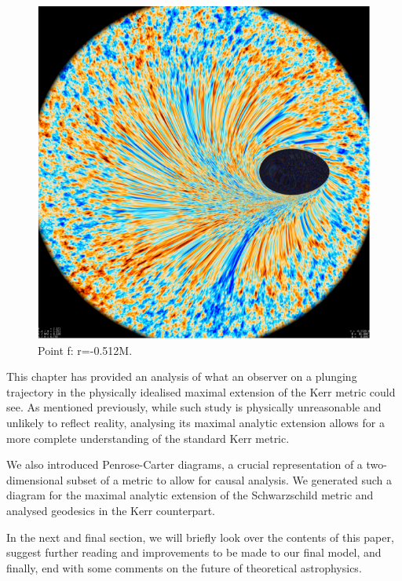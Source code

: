 \documentclass[oneside,openright,frontopenright, singlespacing]{dmathesis}
\begin{document}
\begin{figure}[!ht]
	\centering
	\includegraphics[width=0.63\linewidth]{img/plunging6}
	\caption{Point f: r=-0.512M.}
	\label{fig:Figure6.7}
\end{figure}

	This chapter has provided an analysis of what an observer on a plunging trajectory in the physically idealised maximal extension of the Kerr metric could see. As mentioned previously, while such study is physically unreasonable and unlikely to reflect reality, analysing its maximal analytic extension allows for a more complete understanding of the standard Kerr metric.

\vspace{1em}
	We also introduced Penrose-Carter diagrams, a crucial representation of a two-dimensional subset of a metric to allow for causal analysis. We generated such a diagram for the maximal analytic extension of the Schwarzschild metric and analysed geodesics in the Kerr counterpart.

\vspace{1em}
	In the next and final section, we will briefly look over the contents of this paper, suggest further reading and improvements to be made to our final model, and finally, end with some comments on the future of theoretical astrophysics.
\end{document}
